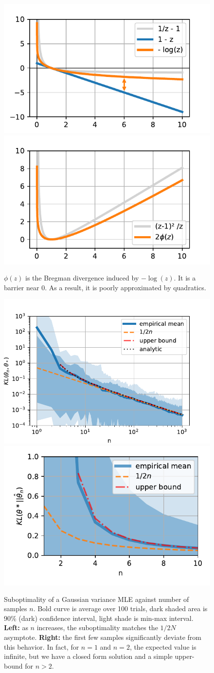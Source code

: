 \documentclass{article}
\begin{document}
\begin{figure}[ht]
	\centering
	\includegraphics[width=.4\textwidth]{figs/bregmandef.pdf}
	\includegraphics[width=.4\textwidth]{figs/phi.pdf}
	\caption{$\phi(z)$ is the Bregman divergence induced by $-\log(z)$. It is a barrier near $0$. As a result, it is poorly approximated by quadratics.}
	\label{fig:phi}
\end{figure}

\begin{figure}[ht]
	\centering
	\includegraphics[width=.54\textwidth]{figs/asymptote.pdf}
	\includegraphics[width=.43\textwidth]{figs/fewsamples.pdf}
	\caption{Suboptimality of a Gaussian variance MLE against number of samples $n$. Bold curve is average over 100 trials,  dark shaded area is 90\% (dark) confidence interval, light shade is min-max interval.  
	\textbf{Left:} as $n$ increases, the suboptimality matches the $1/2N$ asymptote.
	\textbf{Right:} the first few samples significantly deviate from this behavior. In fact, for $n=1$ and $n=2$, the expected value is infinite, but we have a closed form solution and a simple upper-bound for $n>2$.
	}
	\label{fig:curves}
\end{figure}
\end{document}
